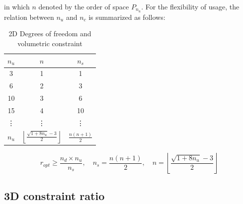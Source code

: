 in which $n$ denoted by the order of space $P_{n_u}$.
For the flexibility of usage, the relation between $n_u$ and $n_c$ is summarized as follows:
\begin{table}[ht!]
\centering
\caption{2D Degrees of freedom and volumetric constraint}
\label{tab:constraint_2D}
\begin{tabular}{ccc}
\toprule
    $n_u$ & $n$ & $n_s$ \\
\midrule
3  & 1 & 1 \\
6  & 2 & 3 \\
10 & 3 & 6 \\
15 & 4 & 10 \\
\vdots & \vdots & \vdots \\
$n_u$ & $\left \lfloor \frac{\sqrt{1+8n_u}-3}{2} \right \rfloor$ & $\frac{n(n+1)}{2}$ \\
\bottomrule
\end{tabular}
\end{table}

\begin{equation}
    r_{opt} \ge \frac{n_d\times n_u}{n_s}
    ,\quad 
    n_s = \frac{n(n + 1)}{2} 
    ,\quad
    n = \left \lfloor \frac{\sqrt{1 + 8n_u} - 3}{2} \right \rfloor 
\end{equation}


\subsection{3D constraint ratio}

